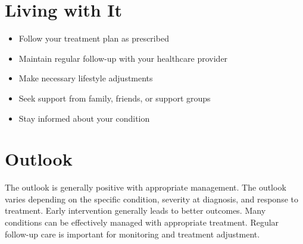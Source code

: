 \section{Living with It}
\begin{itemize}[noitemsep]
  \item Follow your treatment plan as prescribed
  \item Maintain regular follow-up with your healthcare provider
  \item Make necessary lifestyle adjustments
  \item Seek support from family, friends, or support groups
  \item Stay informed about your condition
\end{itemize}
\section{Outlook}
The outlook is generally positive with appropriate management. The outlook varies depending on the specific condition, severity at diagnosis, and response to treatment. Early intervention generally leads to better outcomes. Many conditions can be effectively managed with appropriate treatment. Regular follow-up care is important for monitoring and treatment adjustment.

